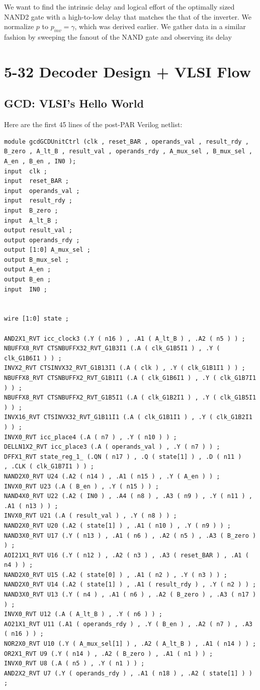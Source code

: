 \documentclass[11pt]{article}
\begin{document}
We want to find the intrinsic delay and logical effort of the optimally sized NAND2 gate with a high-to-low delay that matches the that of the inverter. We normalize $p$ to $p_{inv} = \gamma$, which was derived earlier. We gather data in a similar fashion by sweeping the fanout of the NAND gate and observing its delay

\section{5-32 Decoder Design + VLSI Flow}

\subsection{GCD: VLSI's Hello World}

Here are the first 45 lines of the post-PAR Verilog netlist:
\begin{verbatim}
module gcdGCDUnitCtrl (clk , reset_BAR , operands_val , result_rdy , 
B_zero , A_lt_B , result_val , operands_rdy , A_mux_sel , B_mux_sel , 
A_en , B_en , IN0 );
input  clk ;
input  reset_BAR ;
input  operands_val ;
input  result_rdy ;
input  B_zero ;
input  A_lt_B ;
output result_val ;
output operands_rdy ;
output [1:0] A_mux_sel ;
output B_mux_sel ;
output A_en ;
output B_en ;
input  IN0 ;


wire [1:0] state ;

AND2X1_RVT icc_clock3 (.Y ( n16 ) , .A1 ( A_lt_B ) , .A2 ( n5 ) ) ;
NBUFFX8_RVT CTSNBUFFX32_RVT_G1B3I1 (.A ( clk_G1B5I1 ) , .Y ( clk_G1B6I1 ) ) ;
INVX2_RVT CTSINVX32_RVT_G1B13I1 (.A ( clk ) , .Y ( clk_G1B1I1 ) ) ;
NBUFFX8_RVT CTSNBUFFX2_RVT_G1B1I1 (.A ( clk_G1B6I1 ) , .Y ( clk_G1B7I1 ) ) ;
NBUFFX8_RVT CTSNBUFFX2_RVT_G1B5I1 (.A ( clk_G1B2I1 ) , .Y ( clk_G1B5I1 ) ) ;
INVX16_RVT CTSINVX32_RVT_G1B11I1 (.A ( clk_G1B1I1 ) , .Y ( clk_G1B2I1 ) ) ;
INVX0_RVT icc_place4 (.A ( n7 ) , .Y ( n10 ) ) ;
DELLN1X2_RVT icc_place3 (.A ( operands_val ) , .Y ( n7 ) ) ;
DFFX1_RVT state_reg_1_ (.QN ( n17 ) , .Q ( state[1] ) , .D ( n11 ) 
, .CLK ( clk_G1B7I1 ) ) ;
NAND2X0_RVT U24 (.A2 ( n14 ) , .A1 ( n15 ) , .Y ( A_en ) ) ;
INVX0_RVT U23 (.A ( B_en ) , .Y ( n15 ) ) ;
NAND4X0_RVT U22 (.A2 ( IN0 ) , .A4 ( n8 ) , .A3 ( n9 ) , .Y ( n11 ) , .A1 ( n13 ) ) ;
INVX0_RVT U21 (.A ( result_val ) , .Y ( n8 ) ) ;
NAND2X0_RVT U20 (.A2 ( state[1] ) , .A1 ( n10 ) , .Y ( n9 ) ) ;
NAND3X0_RVT U17 (.Y ( n13 ) , .A1 ( n6 ) , .A2 ( n5 ) , .A3 ( B_zero ) ) ;
AOI21X1_RVT U16 (.Y ( n12 ) , .A2 ( n3 ) , .A3 ( reset_BAR ) , .A1 ( n4 ) ) ;
NAND2X0_RVT U15 (.A2 ( state[0] ) , .A1 ( n2 ) , .Y ( n3 ) ) ;
NAND2X0_RVT U14 (.A2 ( state[1] ) , .A1 ( result_rdy ) , .Y ( n2 ) ) ;
NAND3X0_RVT U13 (.Y ( n4 ) , .A1 ( n6 ) , .A2 ( B_zero ) , .A3 ( n17 ) ) ;
INVX0_RVT U12 (.A ( A_lt_B ) , .Y ( n6 ) ) ;
AO21X1_RVT U11 (.A1 ( operands_rdy ) , .Y ( B_en ) , .A2 ( n7 ) , .A3 ( n16 ) ) ;
NOR2X0_RVT U10 (.Y ( A_mux_sel[1] ) , .A2 ( A_lt_B ) , .A1 ( n14 ) ) ;
OR2X1_RVT U9 (.Y ( n14 ) , .A2 ( B_zero ) , .A1 ( n1 ) ) ;
INVX0_RVT U8 (.A ( n5 ) , .Y ( n1 ) ) ;
AND2X2_RVT U7 (.Y ( operands_rdy ) , .A1 ( n18 ) , .A2 ( state[1] ) ) ;
\end{verbatim}
\end{document}
